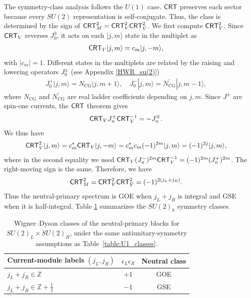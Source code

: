 \documentclass[11pt]{article}
\numberwithin{equation}{section}
\begin{document}
The symmetry-class analysis follows the $U(1)$ case. $\mathsf{CRT}$ preserves each sector because every $SU(2)$ representation is self-conjugate. Thus, the class is determined by the sign of $\mathsf{CRT}_M^2=\mathsf{CRT}_V^2\mathsf{CRT}_{\bar V}^2$. We first compute $\mathsf{CRT}_V^2$.
Since $\mathsf{CRT}_V$ reverses $J_0^3$, it acts on each $|j,m\rangle$ state in the multiplet as
\begin{align}
    \mathsf{CRT}_V |j,m\rangle= c_{m} |j,-m\rangle,
\end{align}
with $|c_{m}|=1$. Different states in the multiplets are related by the raising and lowering operators $J_0^{\pm}$ (see Appendix \ref{HWR_su(2)})
\begin{align}
    J_0^{+}|j,m\rangle = N_{\mathrm{CG}} |j,m+1\rangle, \quad   J_0^{-}|j,m\rangle = N_{\mathrm{CG}}^{\prime} |j,m-1\rangle,
\end{align}
where $N_{\mathrm{CG}}$ and $N_{\mathrm{CG}}^{\prime}$ are real ladder coefficients depending on $j,m$. Since $J^\pm$ are spin-one currents, the $\mathsf{CRT}$ theorem gives
\begin{align}
    \mathsf{CRT}_VJ_n^{\pm} \mathsf{CRT}^{-1}_V=-J_n^{\mp}.
\end{align}
We thus have
\begin{align}
    \mathsf{CRT}_V^2 |j,m\rangle = c_{m}^* \mathsf{CRT}_V |j,-m\rangle = c_{m}^* c_{m} (-1)^{2m}|j,m\rangle = (-1)^{2j}|j,m\rangle,
\end{align}
where in the second equality we used $ \mathsf{CRT}_V(J_n^{-})^{2m} \mathsf{CRT}^{-1}_V=(-1)^{2m}(J_n^{+})^{2m}$.  The right-moving sign is the same. Therefore, we have
\begin{align}    \mathsf{CRT}_M^2=\mathsf{CRT}_V^2\mathsf{CRT}_{\bar V}^2
 =(-1)^{2(j_L+j_R)}.
\end{align}
Thus the neutral-primary spectrum is GOE when $j_L+j_R$ is integral and GSE when it is half-integral. Table \ref{table:SU2_classes} summarizes the $SU(2)_k$ symmetry classes.

\begin{table}[H]
\centering
\begin{tabular}{lcc}
\toprule
Current-module labels $(j_L,j_R)$ & $\epsilon_L\epsilon_R$ & Neutral class\\
\midrule
$j_L+j_R\in\mathbb Z$ & $+1$ & GOE\\
$j_L+j_R\in\mathbb Z+\tfrac12$ & $-1$ & GSE\\
\bottomrule
\end{tabular}
\caption{Wigner--Dyson classes of the neutral-primary blocks for $SU(2)_L\times SU(2)_R$, under the same antiunitary-symmetry assumptions as Table~\ref{table:U1_classes}.}
\label{table:SU2_classes}
\end{table}
\end{document}
